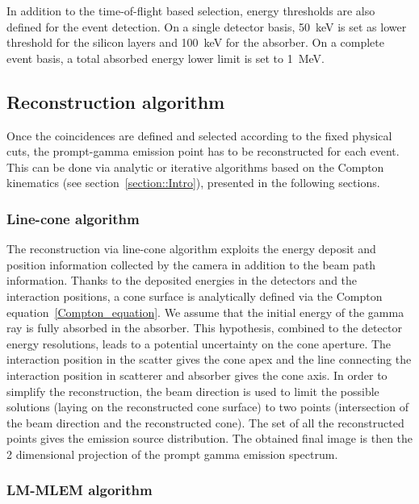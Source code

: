 In addition to the time-of-flight based selection, energy thresholds are also defined for the event detection. On a single detector basis, 50~keV is set as lower threshold for the silicon layers and 100~keV for the absorber. On a complete event basis, a total absorbed energy lower limit is set to 1~MeV.

\subsection{Reconstruction algorithm}

Once the coincidences are defined and selected according to the fixed physical cuts, the prompt-gamma emission point has to be reconstructed for each event. This can be done via analytic or iterative algorithms based on the Compton kinematics (see section~\ref{section::Intro}), presented in the following sections.\\

\subsubsection{Line-cone algorithm}
The reconstruction via line-cone algorithm exploits the energy deposit and position information collected by the camera in addition to the beam path information. Thanks to the deposited energies in the detectors and the interaction positions, a cone surface is analytically defined via the Compton equation~\ref{Compton_equation}.
\newline
We assume that the initial energy of the gamma ray is fully absorbed in the absorber. This hypothesis, combined to the detector energy resolutions, leads to a potential uncertainty on the cone aperture. The interaction position in the scatter gives the cone apex and the line connecting the interaction position in scatterer and absorber gives the cone axis. In order to simplify the reconstruction, the beam direction is used to limit the possible solutions (laying on the reconstructed cone surface) to two points (intersection of the beam direction and the reconstructed cone). The set of all the reconstructed points gives the emission source distribution. The obtained final image is then the 2 dimensional projection of the prompt gamma emission spectrum. 

\subsubsection{LM-MLEM algorithm}	

